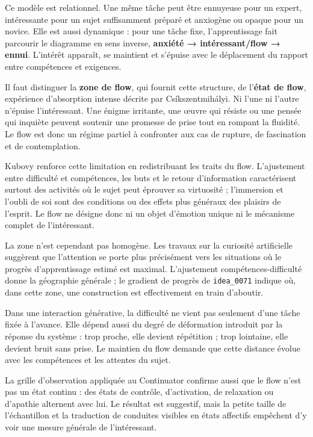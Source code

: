 \documentclass[10pt,a4paper]{article}
\begin{document}
Ce modèle est relationnel. Une même tâche peut être ennuyeuse pour un expert, intéressante pour un sujet suffisamment préparé et anxiogène ou opaque pour un novice. Elle est aussi dynamique : pour une tâche fixe, l'apprentissage fait parcourir le diagramme en sens inverse, \textbf{anxiété → intéressant/flow → ennui}. L'intérêt apparaît, se maintient et s'épuise avec le déplacement du rapport entre compétences et exigences.

Il faut distinguer la \textbf{zone de flow}, qui fournit cette structure, de l'\textbf{état de flow}, expérience d'absorption intense décrite par Csíkszentmihályi. Ni l'une ni l'autre n'épuise l'intéressant. Une énigme irritante, une œuvre qui résiste ou une pensée qui inquiète peuvent soutenir une promesse de prise tout en rompant la fluidité. Le flow est donc un régime partiel à confronter aux cas de rupture, de fascination et de contemplation.

Kubovy renforce cette limitation en redistribuant les traits du flow. L'ajustement entre difficulté et compétences, les buts et le retour d'information caractérisent surtout des activités où le sujet peut éprouver sa virtuosité ; l'immersion et l'oubli de soi sont des conditions ou des effets plus généraux des plaisirs de l'esprit. Le flow ne désigne donc ni un objet d'émotion unique ni le mécanisme complet de l'intéressant.

La zone n'est cependant pas homogène. Les travaux sur la curiosité artificielle suggèrent que l'attention se porte plus précisément vers les situations où le progrès d'apprentissage estimé est maximal. L'ajustement compétences-difficulté donne la géographie générale ; le gradient de progrès de \texttt{idea\_0071} indique où, dans cette zone, une construction est effectivement en train d'aboutir.

Dans une interaction générative, la difficulté ne vient pas seulement d'une tâche fixée à l'avance. Elle dépend aussi du degré de déformation introduit par la réponse du système : trop proche, elle devient répétition ; trop lointaine, elle devient bruit sans prise. Le maintien du flow demande que cette distance évolue avec les compétences et les attentes du sujet.

La grille d'observation appliquée au Continuator confirme aussi que le flow n'est pas un état continu : des états de contrôle, d'activation, de relaxation ou d'apathie alternent avec lui. Le résultat est suggestif, mais la petite taille de l'échantillon et la traduction de conduites visibles en états affectifs empêchent d'y voir une mesure générale de l'intéressant.
\end{document}
